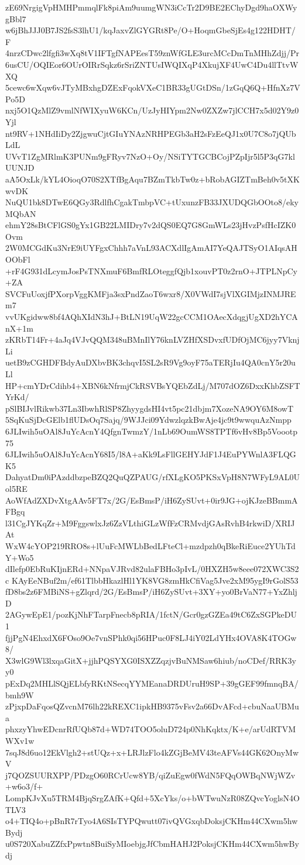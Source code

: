 zE69NrgigVpHMHPmmqlFk8piAm9uumgWN3iCcTr2D9BE2EChyDgd9haOXWygBbl7
w6jBhJJJ0B7JS2fsS3lhU1/kqJaxvZlGYGRt8Pe/O+HoqmGbeSjEs4g122HDHT/F
4nrzCDwc2lfgfi3wXq8tV1IFTgfNAPEesT59znWfGLE3urcMCcDmTnMHhZdjj/Pr
6usCU/OQIEor6OUrOIRrSqkz6rSriZNTUsIWQIXqP4XkujXF4UwC4Du4llTtvWXQ
5cewc6wXqw6vJTyMBxhgDZExFqokVXeC1BR33gUGtDSn/1zGqQ6Q+HfnXz7VPo5D
nxj5O1QzMlZ9vmlNfWIXyuW6KCn/UzJyHIYpm2Nw0ZXZw7jlCCH7x5d02Y9z0Yjl
nt9RV+1NHdIiDy2ZjgwuCjtGIuYNAzNRHPEGb3aH2sFzEeQJ1x0U7C8o7jQUbLdL
UVvT1ZgMRlmK3PUNm9gFRyv7NzO+Oy/NSiTYTGCBCojPZpIjr5l5P3qG7klUUNJD
aA5OxLk/kYL4OioqO70S2XTfBgAqu7BZmTkbTw0z+bRobAGIZTmBeh0v5tXKwvDK
NuQU1bk8DTwE6QGy3RdlfhCgakTmbpVC+tUxunzFB33JXUDQGbOOto8/ekyMQbAN
ehmY28sBtCFlGS0gYx1GB22LMIDry7v2dQS0EQ7G8GmWLs23jHvzPsfHcIZK0Ovm
2W0MCGdKu3NrE9iUYFgxChhh7aVnL93ACXdlIgAmAI7YeQAJTSyO1AIqsAHOObFl
+rF4G931dLcymJosPsTNXmuF6BmfRLOteggfQjb1xouvPT0z2rnO+JTPLNpCy+ZA
SVCFuUoxjfPXorpVggKMFja3sxPndZaoT6wxr8/X0VWdI7sjVlXGIMjzINMJREm7
vvUKgidww8bf4AQhXIdN3hJ+BtLN19UqW22gcCCM1OAecXdqgjUgXD2hYCAnX+1m
zKRbT14Fr+4aJq4VJvQQM348uBMnIlY76knLVZHfXSDvxfUDfOjMC6jyy7VknjLi
uetB9zCGHDFBdyAuDXbvBK3chqvI5SL2sR9Vg9oyF75aTERjIu4QA0cnY5r20uLl
HP+cmYDrCdihb4+XBN6kNfrmjCkRSVBsYQEbZdLj/M707dOZ6DxxKhbZSFTYrKd/
pSlBIJvlRikwb37Ln3IbwhRlSP8ZhyygdsHI4vt5pc21dbjm7XozeNA9OY6M8owT
5SqKuSjDcGElb1flUDsOq7Sajq/9WJJci09YdwzlqzkBwAje4jc9t9wwquAzNmpp
6JLIwih5uOAl8JuYcAcnY4QfgnTwmzY/1nLb69OumWS8TPTf6vHv8Bp5Voootp75
6JLIwih5uOAl8JuYcAcnY68I5/l8A+aKk9LsFllGEHYJdF1J4EuPYWnlA3FLQGK5
DahyatDm0iPAzddbzpeBZQ2QuQZPAUG/rfXLgKO5PKSxVpH8N7WFyL9AL0Uol5RE
AoWfAdZXDvXtgAAv5FT7x/2G/EsBmsP/iH6ZySUvt+0ir9JG+ojKJzeBBmmAFBgq
l31CgJYKqZr+M9FggswlxJz6ZzVLthiGLzWfFzCRMvdjGAsRvhB4rkwiD/XRIJAt
WxW4cYOP219RRO8s+lUuFcMWLbBedLFteCl+mzdpzh0qBkeRiEuce2YUhTdY+Wo5
dIlefp0EbRuKIjnERd+NNpaVJRvd82ulaFBHo3pIvL/0HXZH5w8eee072XWC3S2c
KAyEeNBuf2m/ef61TlbbHkazlHl1YK8VG8zmHkCfiVag5Jve2xM95ygI9rGolS53
fD8bs2z6FMBiNS+gZlqrd/2G/EsBmsP/iH6ZySUvt+3XY+yo0BrVaN77+YxZhljD
2AGywEpE1/pozKjNhFTarpFnecb8pRIA/1fctN/Gcr0gzGZEa49tC6ZxSGPkeDU1
fjjPgN4EhxdX6FOso9Oe7vnSPhk0qi56HPuc0F8LJ4iY02LdYHx4OVA8K4TOGw8/
X3wlG9Wl3lxqaGitX+jjhPQSYXG0ISXZZqzjvBuNMSaw6hiub/noCDef/RRK3yy0
pExDq2MHLlSQjELbfyRKtNSecqYYMEanaDRDUruH9SP+39gGEF99fmnqBA/bmh9W
zPjxpDaFqosQZvcnM76lh22kREXC1ipkHB9375vFsv2a66DvAFcd+cbuNaaUBMua
phxzyYhwEDcnrRfUQb87d+WD74TOO5oluD724p0NhKqktx/K+e/arUdRTVMWXv1w
7sqJ8d6uo12EkVlgh2+stUQz+x+LRJlzFlo4kZGjBeMV43teAFVs44GK62OnyMwV
j7QOZSUURXPP/PDzgO60RCrUcw8YB/qiZuEgw0fWdN5FQqOWBqNWjWZv+w6o3/f+
LompKJvXu5TRM4BjqSrgZAfK+Qfd+5XcYks/o+bWTwuNzR08ZQvcYoglsN4OTLV3
o4+TIQ4o+pBnR7rTyo4A6SIsTYPQwutt07ivQVGxqbDoksjCKHm44CXwm5hwBydj
u0S720XabuZZfxPpwtn8BuiSyMIoebjgJfCbmHAHJ2PoksjCKHm44CXwm5hwBydj
